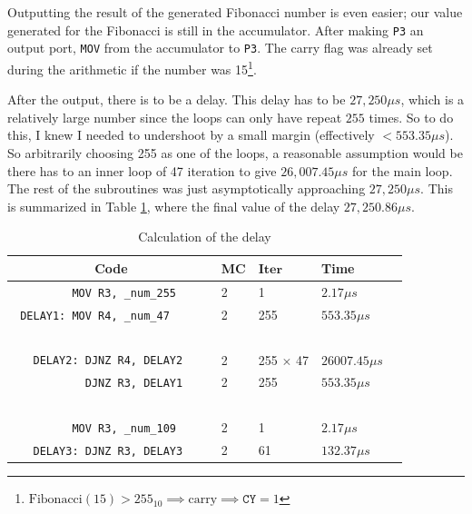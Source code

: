 \documentclass[12pt]{article}
\newcommand{\shellcmd}[1]{\texttt{\colorbox{gray!30}{#1}}}
\begin{document}
Outputting the result of the generated Fibonacci number is even easier; our value generated for the Fibonacci is still in the accumulator. After making \texttt{P3} an output port, \shellcmd{MOV} from the accumulator to \texttt{P3}. The carry flag was already set during the arithmetic if the number was 15\footnote{$\text{Fibonacci}(15) > 255_{10} \implies \text{carry} \implies \texttt{CY} = 1$}.

After the output, there is to be a delay. This delay has to be $27,250 \mu s$, which is a relatively large number since the loops can only have repeat $255$ times. So to do this, I knew I needed to undershoot by a small margin (effectively $< 553.35 \mu s$). So arbitrarily choosing 255 as one of the loops, a reasonable assumption would be there has to an inner loop of 47 iteration to give $26,007.45 \mu s$ for the main loop. The rest of the subroutines was just asymptotically approaching $27,250 \mu s$. This is summarized in Table \ref{table:calculation}, where the final value of the delay $27,250.86 \mu s$.


\begin{table}[!ht]
    \centering
    \begin{tabular}{|c|l|l|l|l|}
        \hline
        \textbf{Code} & \textbf{MC} & $\textbf{Iter}$ & \textbf{Time} \\ \hline
        \verb|         MOV R3, _num_255     | & 2 & 1               & $ 2.17 \mu s$     \\
        \verb| DELAY1: MOV R4, _num_47      | & 2 & 255             & $ 553.35 \mu s$   \\
        \verb|                          | &   &                 &                   \\
        \verb| DELAY2: DJNZ R4, DELAY2  | & 2 & 255 $\times$ 47 & $ 26007.45 \mu s$ \\
        \verb|         DJNZ R3, DELAY1  | & 2 & 255             & $ 553.35 \mu s$   \\
        \verb|                          | &   &                 &                   \\
        \verb|         MOV R3, _num_109     | & 2 & 1               & $ 2.17 \mu s$     \\
        \verb| DELAY3: DJNZ R3, DELAY3  | & 2 & 61              & $ 132.37 \mu s$   \\ \hline
    \end{tabular}

    \caption{Calculation of the delay}
    \label{table:calculation}
\end{table}
\end{document}
